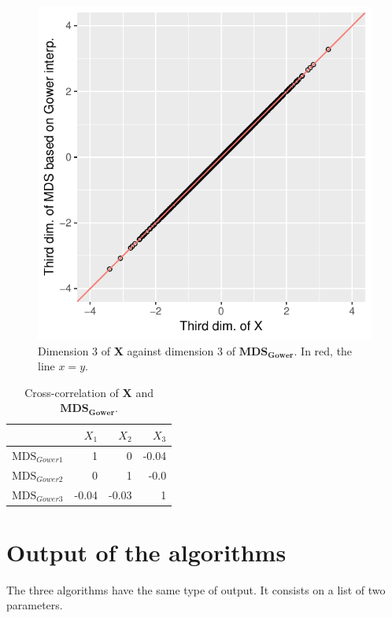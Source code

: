 \documentclass[11pt]{report}
\begin{document}
\begin{figure}[h]
    \centering
    \includegraphics[scale = 1]{./images/third_gower.pdf}
    \caption{Dimension 3 of \textbf{X} against dimension 3 of  $\mathbf{MDS_{Gower}}$. In red, the line $x=y$.}
    \label{gower_example3}
\end{figure}


\FloatBarrier


\begin{table}[ht]
\centering
\begin{tabular}{r|rrr}
 & $X_1$ & $X_2$ & $X_3$ \\ 
  \hline
  $\mbox{MDS}_{Gower1}$ & 1 & 0 & -0.04 \\ 
  $\mbox{MDS}_{Gower2}$ & 0 & 1 & -0.0 \\ 
  $\mbox{MDS}_{Gower3}$ & -0.04 & -0.03 & 1 \\ 
   \hline
\end{tabular}
\caption{Cross-correlation of \textbf{X} and $\mathbf{MDS_{Gower}}$.} 
\label{corr_gower}
\end{table}



\section{Output of the algorithms}
The three algorithms have the same type of output. It consists on a list of 
two parameters. 
\end{document}
